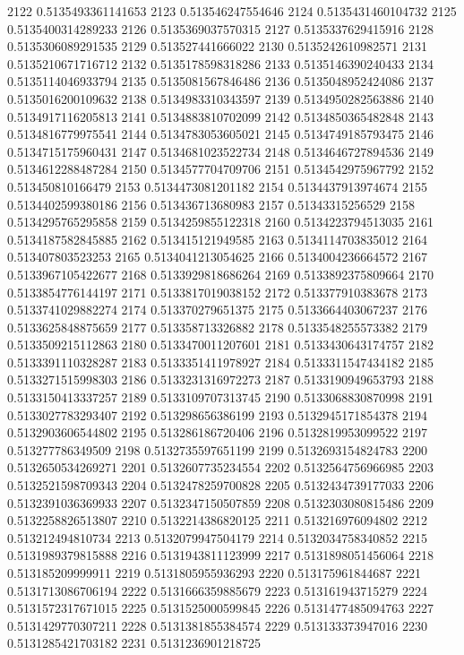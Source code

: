 2122 0.5135493361141653
2123 0.513546247554646
2124 0.5135431460104732
2125 0.5135400314289233
2126 0.5135369037570315
2127 0.5135337629415916
2128 0.5135306089291535
2129 0.513527441666022
2130 0.5135242610982571
2131 0.5135210671716712
2132 0.5135178598318286
2133 0.5135146390240433
2134 0.5135114046933794
2135 0.5135081567846486
2136 0.5135048952424086
2137 0.5135016200109632
2138 0.5134983310343597
2139 0.5134950282563886
2140 0.5134917116205813
2141 0.5134883810702099
2142 0.5134850365482848
2143 0.5134816779975541
2144 0.5134783053605021
2145 0.5134749185793475
2146 0.5134715175960431
2147 0.5134681023522734
2148 0.5134646727894536
2149 0.5134612288487284
2150 0.5134577704709706
2151 0.5134542975967792
2152 0.513450810166479
2153 0.5134473081201182
2154 0.5134437913974674
2155 0.5134402599380186
2156 0.513436713680983
2157 0.51343315256529
2158 0.5134295765295858
2159 0.5134259855122318
2160 0.5134223794513035
2161 0.5134187582845885
2162 0.513415121949585
2163 0.5134114703835012
2164 0.513407803523253
2165 0.5134041213054625
2166 0.5134004236664572
2167 0.5133967105422677
2168 0.5133929818686264
2169 0.5133892375809664
2170 0.5133854776144197
2171 0.5133817019038152
2172 0.513377910383678
2173 0.5133741029882274
2174 0.513370279651375
2175 0.5133664403067237
2176 0.5133625848875659
2177 0.513358713326882
2178 0.5133548255573382
2179 0.5133509215112863
2180 0.5133470011207601
2181 0.5133430643174757
2182 0.5133391110328287
2183 0.5133351411978927
2184 0.5133311547434182
2185 0.5133271515998303
2186 0.5133231316972273
2187 0.5133190949653793
2188 0.5133150413337257
2189 0.5133109707313745
2190 0.5133068830870998
2191 0.5133027783293407
2192 0.513298656386199
2193 0.5132945171854378
2194 0.5132903606544802
2195 0.513286186720406
2196 0.5132819953099522
2197 0.513277786349509
2198 0.5132735597651199
2199 0.5132693154824783
2200 0.5132650534269271
2201 0.5132607735234554
2202 0.5132564756966985
2203 0.5132521598709343
2204 0.5132478259700828
2205 0.5132434739177033
2206 0.5132391036369933
2207 0.5132347150507859
2208 0.5132303080815486
2209 0.5132258826513807
2210 0.5132214386820125
2211 0.513216976094802
2212 0.513212494810734
2213 0.5132079947504179
2214 0.5132034758340852
2215 0.5131989379815888
2216 0.5131943811123999
2217 0.5131898051456064
2218 0.513185209999911
2219 0.5131805955936293
2220 0.513175961844687
2221 0.5131713086706194
2222 0.5131666359885679
2223 0.513161943715279
2224 0.5131572317671015
2225 0.5131525000599845
2226 0.5131477485094763
2227 0.5131429770307211
2228 0.5131381855384574
2229 0.513133373947016
2230 0.5131285421703182
2231 0.5131236901218725
